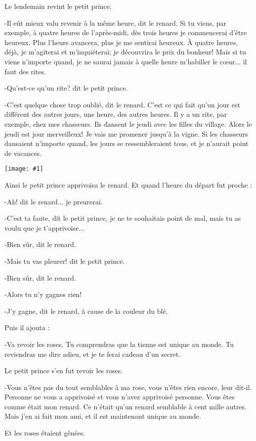 \documentclass{report}
\newcommand{\incpic}[1]{%
\begin{center}
    \texttt{[image: \#1]}
\end{center}%
}
\begin{document}
Le lendemain revint le petit prince.

-Il eût mieux valu revenir à la même heure, dit le renard. Si tu viens, par exemple, à quatre heures de l'après-midi, dès trois heures je commencerai d'être heureux. Plus l'heure avancera, plus je me sentirai heureux. À quatre heures, déjà, je m'agiterai et m'inquiéterai; je découvrira le prix du bonheur! Mais si tu viens n'importe quand, je ne saurai jamais à quelle heure m'habiller le cœur... il faut des rites.

-Qu'est-ce qu'un rite? dit le petit prince.

-C'est quelque chose trop oublié, dit le renard. C'est ce qui fait qu'un jour est différent des autres jours, une heure, des autres heures. Il y a un rite, par exemple, chez mes chasseurs. Ils dansent le jeudi avec les filles du village. Alors le jeudi est jour merveilleux! Je vais me promener jusqu'à la vigne. Si les chasseurs dansaient n'importe quand, les jours se ressembleraient tous, et je n'aurait point de vacances.

\incpic{pic/image39.jpeg}

Ainsi le petit prince apprivoisa le renard. Et quand l'heure du départ fut proche :

-Ah! dit le renard... je preurerai.

-C'est ta faute, dit le petit prince, je ne te souhaitais point de mal, mais tu as voulu que je t'apprivoise...

-Bien sûr, dit le renard.

-Mais tu vas pleurer! dit le petit prince.

-Bien sûr, dit le renard.

-Alors tu n'y gagnes rien!

-J'y gagne, dit le renard, à cause de la couleur du blé.

Puis il ajouta :

-Va revoir les roses. Tu comprendras que la tienne est unique au monde. Tu reviendras me dire adieu, et je te ferai cadeau d'un secret.

Le petit prince s'en fut revoir les roses.

-Vous n'êtes pas du tout semblables à ma rose, vous n'êtes rien encore, leur dit-il. Personne ne vous a apprivoisé et vous n'avez apprivoisé personne. Vous êtes comme était mon renard. Ce n'était qu'un renard semblable à cent mille autres. Mais j'en ai fait mon ami, et il est maintenant unique au monde.

Et les roses étaient gênées.
\end{document}
